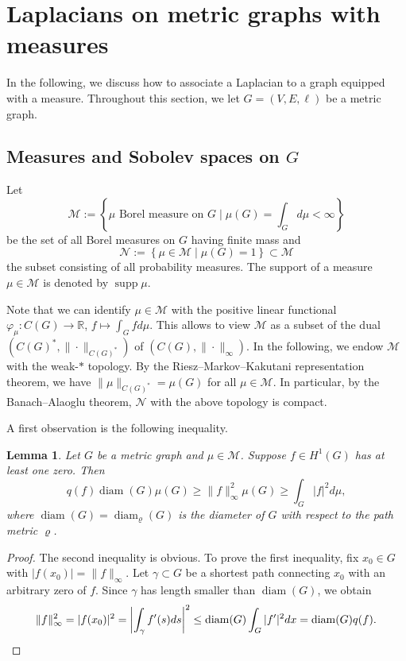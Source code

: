\documentclass[reqno]{amsart}
\theoremstyle{plain}
\newtheorem{lem}[thm]{Lemma}
\theoremstyle{definition}
\theoremstyle{remark}
\numberwithin{equation}{section}
\newcommand{\R}{\mathbb{R}}     %
\newcommand{\cM}{\mathcal{M}}
\newcommand{\cN}{\mathcal{N}}
\newcommand{\supp}{\operatorname{supp}}
\newcommand{\diam}{\operatorname{diam}}
\begin{document}
\section{Laplacians on metric graphs with measures}	 \label{sec:LaplaciansMeasures}
In the following, we discuss how to associate a Laplacian to a graph equipped with a measure. Throughout this section, we let $G = (V,E, \ell)$ be a metric graph.
\subsection{Measures and Sobolev spaces on $G$}
Let 
		\[
		\cM:= \left\{\mu \text{ Borel measure on } G \; | \; \mu(G)=\int_{G}d\mu<\infty \right\}
		\] 
		be the set of all Borel measures on $G$ having finite mass and
		\[
		\cN := \left\{\mu\in \cM \; | \; \mu(G)=1 \right\} \subset \cM
		\]
		the subset consisting of all probability measures. The support of a measure $\mu \in  \cM$ is denoted by $\supp \mu$.
		
		Note that we can identify $\mu  \in \cM$ with the positive linear functional $\varphi_\mu\colon C(G) \to \R$, $f \mapsto \int_G f d\mu$. This allows to view $\cM$ as a subset of the dual $(C(G)^\ast, \|\cdot\|_{C(G)^\ast})$ of $(C(G), \|\cdot\|_{\infty})$. In the following, we endow $\cM$ with the weak-$\ast$ topology. By the Riesz–Markov–Kakutani representation theorem, we have $\|\mu\|_{C(G)^\ast} = \mu(G)$ for all $\mu \in \cM$. In particular, by the Banach–Alaoglu theorem, $\cN$ with the above topology is compact.
		
		
		A first observation is the following inequality.
		\begin{lem}\label{Prop: Nicaise}
			Let $G$ be a metric graph and $\mu \in \cM$. Suppose $f\in H^1(G)$ has at least one zero. Then 
			\begin{equation}\label{eq: Dirichlet Nicaise}
				q(f) \diam(G) \mu(G)\geq \|f\|_\infty^2 \mu(G)\geq \int_G |f|^2 d\mu,
			\end{equation}
			where $\diam(G)= \diam_\varrho(G)$ is the diameter of $G$ with respect to the path metric $\varrho$. 
		\end{lem}
		\begin{proof}
			The second inequality is obvious. To prove the first inequality, fix $x_0\in G$ with $|f(x_0)| = \|f\|_\infty$. Let $\gamma \subset G$ be a shortest path connecting $x_0$ with an arbitrary zero of $f$. Since $\gamma$ has length smaller than $\diam(G)$, we obtain
			\[
			\|f\|_\infty^2= |f(x_0)|^2 = \left|\int_\gamma f'(s)ds\right|^2 \leq \diam(G) \int_{G} |f'|^2 dx  =  \diam(G) q(f). \qedhere
			\]
		\end{proof}
		
\end{document}
